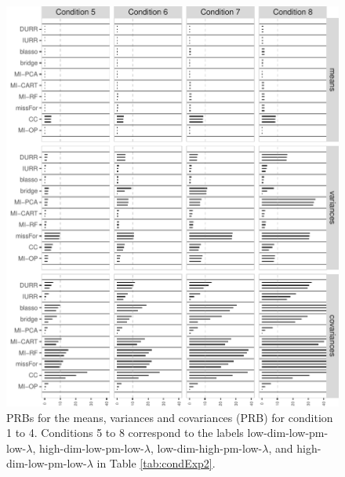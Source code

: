 \begin{figure}
	\includegraphics{../../output/graphs/exp2_semR_bias_58_summy.pdf}
\caption{PRBs for the means, variances and covariances (PRB) for condition 1 to 4.
	Conditions 5 to 8 correspond to the labels low-dim-low-pm-low-$\lambda$, high-dim-low-pm-low-$\lambda$, 
	low-dim-high-pm-low-$\lambda$, and high-dim-low-pm-low-$\lambda$ in Table \ref{tab:condExp2}.
}
\label{fig:exp2bias58}
\end{figure}

